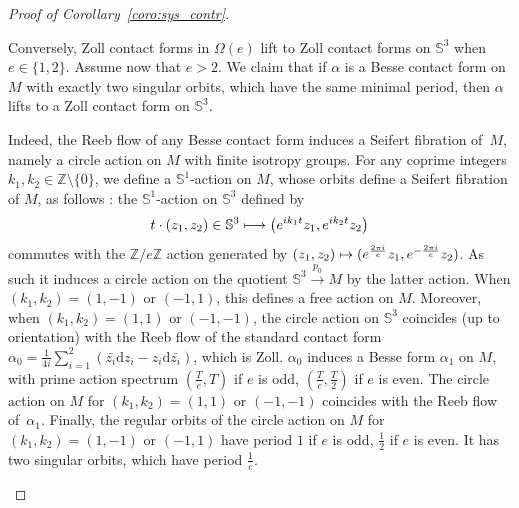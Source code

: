 \documentclass[AHL,Unicode,longabstracts]{cedram}
\newcommand{\bbS}{\mathbb{S}}
\newcommand{\bbZ}{\mathbb{Z}}
\newcommand{\rmd}{\mathrm{d}}
\let\oldmapsto\mapsto
\renewcommand*{\mapsto}{\mathchoice{\longmapsto}{\oldmapsto}{\oldmapsto}{\oldmapsto}}
\newcommand{\bbS}{\mathbb{S}}
\begin{document}
\begin{proof}[{Proof of Corollary~\ref{coro:sys_contr}}]
\begin{itemize}
Conversely, Zoll contact forms in $\Omega(e)$ lift to Zoll contact forms on $\bbS^3$ when $e \in \{1,2\}$. Assume now that $e>2$. We claim that if $\alpha$ is a Besse contact form on $M$ with exactly two singular orbits, which have the same minimal period, then $\alpha$ lifts to a Zoll contact form on $\bbS^3$.

Indeed, the Reeb flow of any Besse contact form induces a Seifert fibration of~$M$, namely a circle action on $M$ with finite isotropy groups. For any coprime integers $k_1, k_2 \in \bbZ \setminus \{0\}$, we define a $\bbS^1$-action on $M$, whose orbits define a Seifert fibration of $M$, as follows : the $\bbS^1$-action on $\bbS^3$ defined by
\[
t \cdot (z_1,z_2) \in \bbS^3 \mapsto \left(e^{i k_1 t} z_1, e^{i k_2 t} z_2\right)
\]
commutes with the $\bbZ / e \bbZ$ action generated by $(z_1, z_2) \mapsto (e^{\frac{2 \pi i}{e}} z_1, e^{-\frac{2 \pi i}{e}} z_2)$. As such it induces a circle action on the quotient $\bbS^3 \xrightarrow{p_0} M$ by the latter action. When $(k_1,k_2) = (1, -1)$ or $(-1,1)$, this defines a free action on $M$. Moreover, when $(k_1,k_2) = (1, 1)$ or $(-1,-1)$, the circle action on $\bbS^3$ coincides (up to orientation) with the Reeb flow of the standard contact form $\alpha_0 = \frac{1}{4i}\sum_{i=1}^{2}(\bar{z_i} \rmd z_i - z_i \rmd \bar{z_i})$, which is Zoll. $\alpha_0$ induces a Besse form $\alpha_1$ on $M$, with prime action spectrum $(\frac{T}{e}, T)$ if $e$ is odd, $(\frac{T}{e}, \frac{T}{2})$ if $e$ is even. The circle action on $M$ for $(k_1,k_2) = (1, 1)$ or $(-1,-1)$ coincides with the Reeb flow of~$\alpha_1$. Finally, the regular orbits of the circle action on $M$ for $(k_1,k_2) = (1, -1)$ or $(-1,1)$ have period $1$ if $e$ is odd, $\frac{1}{2}$ if $e$ is even. It has two singular orbits, which have period $\frac{1}{e}$.


\end{itemize}
\end{proof}
\end{document}
